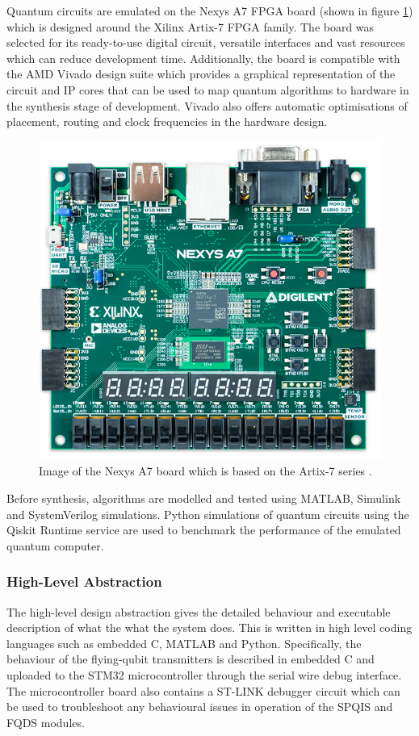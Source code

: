Quantum circuits are emulated on the Nexys A7 FPGA board (shown in figure \ref{fig:nexys-a7}) which is designed around the Xilinx Artix-7 FPGA family. The board was selected for its ready-to-use digital circuit, versatile interfaces and vast resources which can reduce development time. Additionally, the board is compatible with the AMD Vivado design suite which provides a graphical representation of the circuit and IP cores that can be used to map quantum algorithms to hardware in the synthesis stage of development. Vivado also offers automatic optimisations of placement, routing and clock frequencies in the hardware design. 
\begin{figure}[!ht]
	\centering
	\includegraphics[width=0.55\linewidth]{body/ch4/figs/nexys-a7}
	\caption[Nexys A7 Board based on the Xilinx 7-Series FPGAs.]{Image of the Nexys A7 board which is based on the Artix-7 series \cite{diligent2024nexysa7}.}
	\label{fig:nexys-a7}
\end{figure}

Before synthesis, algorithms are modelled and tested using MATLAB, Simulink and SystemVerilog simulations. Python simulations of quantum circuits using the Qiskit Runtime service are used to benchmark the performance of the emulated quantum computer. 

\subsubsection*{High-Level Abstraction}

The high-level design abstraction gives the detailed behaviour and executable description of what the what the system does. This is written in high level coding languages such as embedded C, MATLAB and Python. Specifically, the behaviour of the flying-qubit transmitters is described in embedded C and uploaded to the STM32 microcontroller through the serial wire debug interface. The microcontroller board also contains a ST-LINK debugger circuit which can be used to troubleshoot any behavioural issues in operation of the SPQIS and FQDS modules. 

